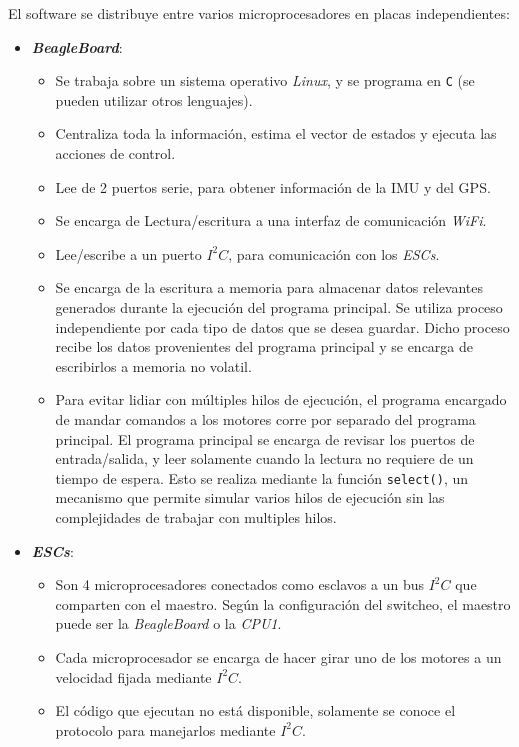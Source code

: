\documentclass[main]{subfiles}
\begin{document}
El software se distribuye entre varios microprocesadores en placas independientes:
\begin{itemize}
\item \textbf{\textit{BeagleBoard}}:
  \begin{itemize}
  \item Se trabaja sobre un sistema operativo \textit{Linux}, y se programa en \verb+C+ (se pueden utilizar otros lenguajes).
  \item Centraliza toda la informaci\'on, estima el vector de estados y ejecuta las acciones de control.
  \item Lee de 2 puertos serie, para obtener informaci\'on de la IMU y del GPS.
  \item Se encarga de Lectura/escritura a una interfaz de comunicaci\'on \textit{WiFi}.
  \item Lee/escribe a un puerto $I^2C$, para comunicaci\'on con los \textit{ESCs}.
  \item Se encarga de la escritura a memoria para almacenar datos relevantes generados durante la ejecuci\'on del programa principal. Se utiliza proceso independiente por cada tipo de datos que se desea guardar. Dicho proceso recibe los datos provenientes del programa principal y se encarga de escribirlos a memoria no volatil.
  \item Para evitar lidiar con m\'ultiples hilos de ejecuci\'on, el programa encargado de mandar comandos a los motores corre por separado del programa principal. El programa principal se encarga de revisar los puertos de entrada/salida, y leer solamente cuando la lectura no requiere de un tiempo de espera. Esto se realiza mediante la funci\'on \verb+select()+, un mecanismo que permite simular varios hilos de ejecuci\'on sin las complejidades de trabajar con multiples hilos.
  \end{itemize}
\item \textbf{\textit{ESCs}}:
  \begin{itemize}
  \item Son 4 microprocesadores conectados como esclavos a un bus $I^2C$ que comparten con el maestro. Seg\'un la configuraci\'on del switcheo, el maestro puede ser la \textit{BeagleBoard} o la \textit{CPU1}.
  \item Cada microprocesador se encarga de hacer girar uno de los motores a un velocidad fijada mediante $I^2C$.
  \item El c\'odigo que ejecutan no est\'a disponible, solamente se conoce el protocolo para manejarlos mediante $I^2C$.
  \end{itemize}

\end{itemize}
\end{document}
